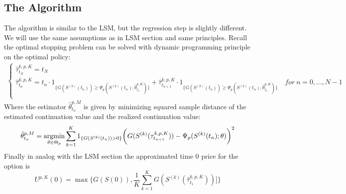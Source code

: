 \subsection{The Algorithm}
The algorithm is similar to the LSM, but the regression step is slightly different. We will use the same assumptions as in LSM section and same principles. Recall the optimal stopping problem can be solved with dynamic programming principle on the optimal policy:
\begin{equation*}\label{LSMDynamic3}
\begin{split}
\begin{cases}
          \hat{\tau}_{t_N}^{k,p,K} = t_N\\
          \hat{\tau}_{t_n}^{k,p,K} = t_n \cdot 1_{\{G(S^{(k)}(t_n)) \geq \Psi_p(S^{(k)}(t_n) ; \hat{\theta}_{t_n}^{p,K} ) \}} + \hat{\tau}_{t_{n+1}}^{k,p,K} \cdot 1_{\{G(S^{(k)}(t_n)) \geq \Psi_p(S^{(k)}(t_n) ; \hat{\theta}_{t_n}^{p,K} ) \}} \quad for \ n={0,\ldots,N-1} \\ 
\end{cases}
\end{split}
\end{equation*}
Where the estimator $\hat{\theta}_{t_n}^{p,M}$ is given by minimizing squared sample distance of the estimated continuation value and the realized continuation value:
\begin{align*}
\hat{\theta}_{t_n}^{p,M}= \operatorname*{argmin}_{\theta \in \Theta_p} \sum_{k=1}^{K} 1_{\{G(S^{(k)}(t_n))>0\}} \bigg(G(S^{(k)}(\tau^{k,p,K}_{t_{n+1}}))  - \Psi_p(S^{(k)}(t_n) ; \theta ) \bigg)^2
\end{align*}
Finally in analog with the LSM section the approximated time 0 price for the option is
\begin{equation*}
U^{p,K}(0) = \max \{ G(S(0)), \frac{1}{K} \sum_{k=1}^{K} G(S^{(k)}(\hat{\tau}^{k,p,K}_{t_1}))]\}
\end{equation*}


\newpage


